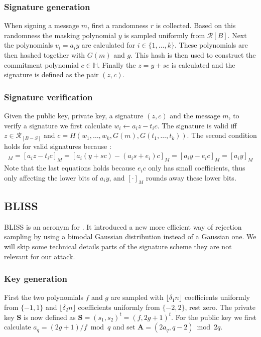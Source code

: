 \subsubsection{Signature generation}
When signing a message $m$, first a randomness $r$ is collected. Based on this randomness the masking polynomial $y$ is sampled uniformly from $\mathcal{R}[B]$.
Next the polynomials $v_{i} = a_{i}y$ are calculated for $i \in \{1, \ldots, k\}$. These polynomials are then hashed together with $G(m)$ and $g$. This hash is then used to construct the commitment polynomial $c \in \mathds{H}$. Finally the $z = y + sc$ is calculated and the signature is defined as the pair $(z, c)$.

\subsubsection{Signature verification}
Given the public key, private key, a signature $(z, c)$ and the message $m$, to verify a signature we first calculate $w_{i} \leftarrow a_{i} z - t_{i} c$.
The signature is valid iff $z \in \mathcal{R}_{[B-S]}$ and $c = H(w_{1}, \ldots, w_{k}, G(m), G(t_{1}, \ldots, t_{k}))$.
The second condition holds for valid signatures because \cite[p. 445]{qtesla}:
\begin{align}
	[w_i]_{M} = [a_{i}z-t_{i}c]_{M} = [a_{i}(y+sc) - (a_{i}s+e_{i})c]_{M} = [a_{i}y - e_{i} c]_{M} = [a_{i}y]_{M}
\end{align}
Note that the last equations holds because $e_ic$ only has small coefficients, thus only affecting the lower bits of $a_iy$, and $[\cdot]_{M}$ rounds away these lower bits.



\subsection{BLISS}
\label{sec:blissdesc}
BLISS \cite{bliss}  is an acronym for . It introduced a new more efficient way of rejection sampling by using a bimodal Gaussian distribution instead of a Gaussian one. We will skip some technical details parts of the signature scheme they are not relevant for our attack.

\subsubsection{Key generation}
\label{sec:blisskeygen}
First the two polynomials $f$ and $g$ are sampled with $\lfloor \delta_{1} n \rfloor$ coefficients uniformly from $\{-1, 1\}$ and   $\lfloor \delta_{2} n \rfloor$ coefficients uniformly from $\{-2, 2\}$, rest zero.
The private key $\bm{S}$ is now defined as $\bm{S} = (s_{1}, s_{2})^{t} = (f, 2g+1)^{t}$.
For the public key we first calculate $a_{q} = (2 g + 1) / f \bmod q$ and set $\bm{A} = (2 a_{q}, q - 2) \bmod 2q$.

